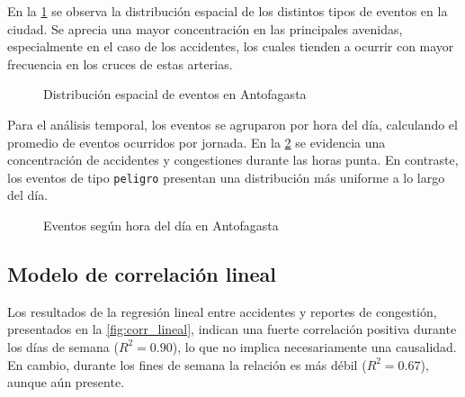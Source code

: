 \documentclass[12pt]{article}
\begin{document}
En la \cref{fig:dist_events} se observa la distribución espacial de los distintos tipos de eventos en la ciudad. Se aprecia una mayor concentración en las principales avenidas, especialmente en el caso de los accidentes, los cuales tienden a ocurrir con mayor frecuencia en los cruces de estas arterias.

\begin{figure}[H]
    \centering
    \caption{Distribución espacial de eventos en Antofagasta}
    \label{fig:dist_events}
\end{figure}

Para el análisis temporal, los eventos se agruparon por hora del día, calculando el promedio de eventos ocurridos por jornada. En la \cref{fig:time_events} se evidencia una concentración de accidentes y congestiones durante las horas punta. En contraste, los eventos de tipo \texttt{peligro} presentan una distribución más uniforme a lo largo del día.

\begin{figure}[H]
    \centering
    \newline
    \newline
    \newline
    \caption{Eventos según hora del día en Antofagasta}
    \label{fig:time_events}
\end{figure}

\subsection{Modelo de correlación lineal}

Los resultados de la regresión lineal entre accidentes y reportes de congestión, presentados en la \cref{fig:corr_lineal}, indican una fuerte correlación positiva durante los días de semana ($R^2 = 0.90$), lo que no implica necesariamente una causalidad. En cambio, durante los fines de semana la relación es más débil ($R^2 = 0.67$), aunque aún presente.
\end{document}
